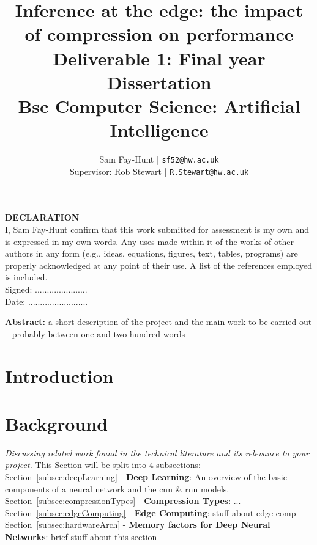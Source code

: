 \documentclass[11pt]{article}
\begin{document}
\title{%
	\bf Inference at the edge: the impact of compression on performance\\ 
	\large Deliverable 1: Final year Dissertation \\
	Bsc Computer Science: Artificial Intelligence}

\author{
	Sam Fay-Hunt | \texttt{sf52@hw.ac.uk}\\
	Supervisor: Rob Stewart | \texttt{R.Stewart@hw.ac.uk}
}

\maketitle
\thispagestyle{empty}
\pagebreak

\textbf{DECLARATION}\\
I, Sam Fay-Hunt confirm that this work submitted for assessment is my own and is expressed in
my own words. Any uses made within it of the works of other authors in any form (e.g., ideas,
equations, figures, text, tables, programs) are properly acknowledged at any point of their
use. A list of the references employed is included.\\
Signed: ......................\\
Date: .........................
\thispagestyle{empty}
\pagebreak

\textbf{Abstract:} a short description of the project and the main work to be carried out – probably
between one and two hundred words
\thispagestyle{empty}
\pagebreak

\tableofcontents
\thispagestyle{empty}
\pagebreak


\setcounter{page}{1}

\section{Introduction}


\pagebreak
\section{Background}
\emph{Discussing related work found in the technical literature and its relevance to your project.}
This Section will be split into 4 subsections:\\
Section~\ref{subsec:deepLearning} - \textbf{Deep Learning}: An overview of the basic components of a neural network and the \acrshort{cnn} \& \acrshort{rnn} models.\\
Section~\ref{subsec:compressionTypes} - \textbf{Compression Types}: ...\\
Section~\ref{subsec:edgeComputing} - \textbf{Edge Computing}: stuff about edge comp\\
Section~\ref{subsec:hardwareArch} - \textbf{Memory factors for Deep Neural Networks}: brief stuff about this section
\end{document}
